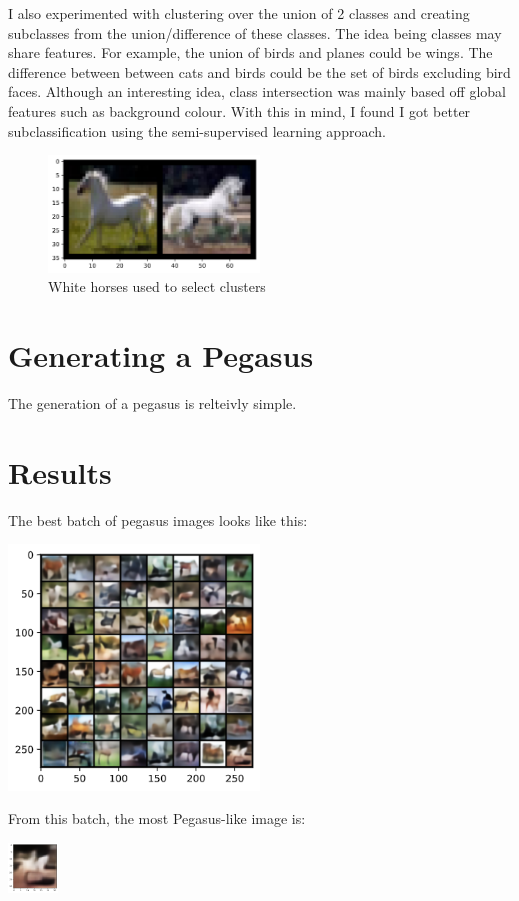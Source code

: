 \documentclass{article}
\begin{document}
I also experimented with clustering over the union of 2 classes and creating subclasses from the union/difference of these classes. The idea being classes may share features. For example, the union of birds and planes could be wings. The difference between between cats and birds could be the set of birds excluding bird faces. Although an interesting idea, class intersection was mainly based off global features such as background colour. With this in mind, I found I got better subclassification using the semi-supervised learning approach.

\begin{figure}
    \begin{center}
        \includegraphics[width=0.5\textwidth]{figures/good_horses.png}
    \end{center}
    \caption{White horses used to select clusters}
    \label{fig:good_horses}
\end{figure}

\section{Generating a Pegasus}
The generation of a pegasus is relteivly simple. 

\section{Results}
The best batch of pegasus images looks like this:
\begin{center}
    \includegraphics[width=0.5\textwidth]{figures/kinda_allright64.png}
\end{center}
From this batch, the most Pegasus-like image is:
\begin{center}
    \includegraphics[width=0.1\textwidth]{figures/kinda_allright1.png}
\end{center}
\end{document}
